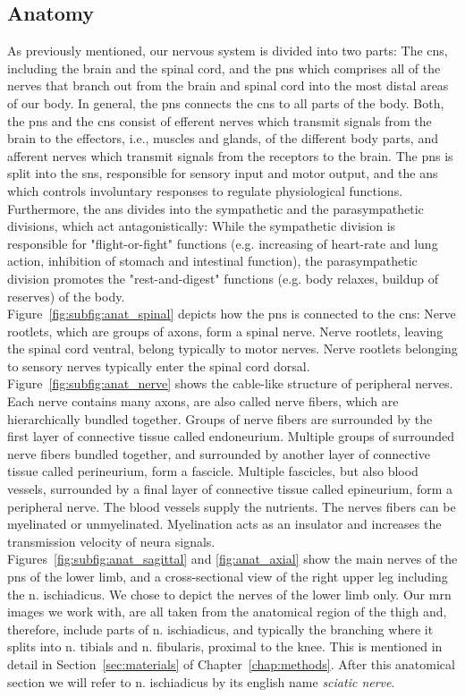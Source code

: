 \subsection{Anatomy}
As previously mentioned, our nervous system is divided into two parts: The \gls{cns}, including the brain and the spinal cord, and the \gls{pns} which comprises all of the nerves that branch out from the brain and spinal cord into the most distal areas of our body. In general, the \gls{pns} connects the \gls{cns} to all parts of the body. Both, the \gls{pns} and the \gls{cns} consist of efferent nerves which transmit signals from the brain to the effectors, i.e., muscles and glands, of the different body parts, and afferent nerves which transmit signals from the receptors to the brain. The \gls{pns} is split into the \gls{sns}, responsible for sensory input and motor output, and the \gls{ans} which controls involuntary responses to regulate physiological functions. Furthermore, the \gls{ans} divides into the sympathetic and the parasympathetic divisions, which act antagonistically: While the sympathetic division is responsible for "flight-or-fight" functions (e.g. increasing of heart-rate and lung action, inhibition of stomach and intestinal function), the parasympathetic division promotes the "rest-and-digest" functions (e.g. body relaxes, buildup of reserves) of the body.\\
Figure~\ref{fig:subfig:anat_spinal} depicts how the \gls{pns} is connected to the \gls{cns}: Nerve rootlets, which are groups of axons, form a spinal nerve. Nerve rootlets, leaving the spinal cord ventral, belong typically to motor nerves. Nerve rootlets belonging to sensory nerves typically enter the spinal cord dorsal.\\
Figure~\ref{fig:subfig:anat_nerve} shows the cable-like structure of peripheral nerves. Each nerve contains many axons, are also called nerve fibers, which are hierarchically bundled together. Groups of nerve fibers are surrounded by the first layer of connective tissue called endoneurium. Multiple groups of surrounded nerve fibers bundled together, and surrounded by another layer of connective tissue called perineurium, form a fascicle. Multiple fascicles, but also blood vessels, surrounded by a final layer of connective tissue called epineurium, form a peripheral nerve. The blood vessels supply the nutrients. The nerves fibers can be myelinated or unmyelinated. Myelination acts as an insulator and increases the transmission velocity of neura signals.\\
Figures~\ref{fig:subfig:anat_sagittal} and \ref{fig:anat_axial} show the main nerves of the \gls{pns} of the lower limb, and a cross-sectional view of the right upper leg including the \gls{n.} ischiadicus. We chose to depict the nerves of the lower limb only. Our \gls{mrn} images we work with, are all taken from the anatomical region of the thigh and, therefore, include parts of \gls{n.} ischiadicus, and typically the branching where it splits into \gls{n.} tibials and \gls{n.} fibularis, proximal to the knee. This is mentioned in detail in Section~\ref{sec:materials} of Chapter~\ref{chap:methods}. After this anatomical section we will refer to \gls{n.} ischiadicus by its english name \textit{sciatic nerve}.

